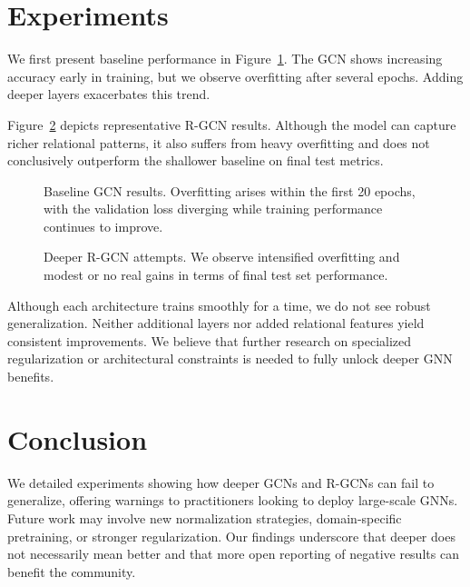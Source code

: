 \documentclass{article}
\begin{document}
\section{Experiments}
We first present baseline performance in Figure~\ref{fig:baseline}. The GCN shows increasing accuracy early in training, but we observe overfitting after several epochs. Adding deeper layers exacerbates this trend. 

Figure~\ref{fig:rgcn} depicts representative R-GCN results. Although the model can capture richer relational patterns, it also suffers from heavy overfitting and does not conclusively outperform the shallower baseline on final test metrics.

\begin{figure}[t]
\centering
{}
\caption{Baseline GCN results. Overfitting arises within the first 20 epochs, with the validation loss diverging while training performance continues to improve.}
\label{fig:baseline}
\end{figure}

\begin{figure}[t]
\centering
{}
\caption{Deeper R-GCN attempts. We observe intensified overfitting and modest or no real gains in terms of final test set performance.}
\label{fig:rgcn}
\end{figure}

Although each architecture trains smoothly for a time, we do not see robust generalization. Neither additional layers nor added relational features yield consistent improvements. We believe that further research on specialized regularization or architectural constraints is needed to fully unlock deeper GNN benefits.

\section{Conclusion}
We detailed experiments showing how deeper GCNs and R-GCNs can fail to generalize, offering warnings to practitioners looking to deploy large-scale GNNs. Future work may involve new normalization strategies, domain-specific pretraining, or stronger regularization. Our findings underscore that deeper does not necessarily mean better and that more open reporting of negative results can benefit the community.
\end{document}
